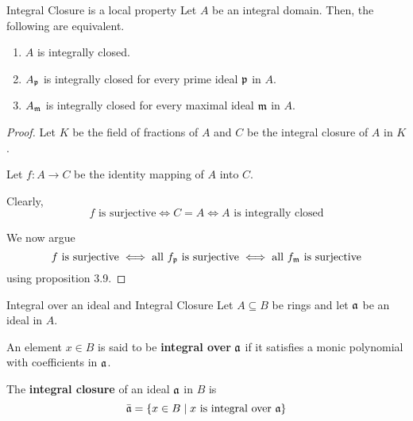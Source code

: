 \begin{proposition}{Integral Closure is a local property}{}
\label{prop:5.13}
	Let \(A\) be an integral domain.
	Then, the following are equivalent.
	\begin{enumerate}
		\item \(A\) is integrally closed.
		\item \(A_{\mathfrak{p}}\) is integrally closed for every prime ideal
			\(\mathfrak{p}\) in \(A\).
		\item \(A_{\mathfrak{m}}\) is integrally closed for every maximal ideal
			\(\mathfrak{m}\) in \(A\).
	\end{enumerate}
\end{proposition}
\begin{proof}
	Let \(K\) be the field of fractions of \(A\) and \(C\) be the integral
	closure of \(A\) in \(K\).

	Let \(f \colon A \to C\) be the identity mapping of \(A\) into \(C\).

	Clearly,
	\[
		f \text{ is surjective} \iff C = A \iff A \text{ is integrally closed}
	\]

	We now argue
	\[
		f \text{ is surjective} \iff \text{all }f_{\mathfrak{p}} \text{ is surjective}
		\iff \text{all } f_{\mathfrak{m}} \text{ is surjective}
	\]
	using proposition 3.9.
\end{proof}

\begin{defn}{Integral over an ideal and Integral Closure}{}
	Let \(A \subseteq B\) be rings and let \(\mathfrak{a}\) be an ideal in \(A\).

	An element \(x \in B\) is said to be \textbf{integral over} \(\mathfrak{a}\)
	if it satisfies a monic polynomial with coefficients in \(\mathfrak{a}\).

	The \textbf{integral closure} of an ideal \(\mathfrak{a}\) in \(B\) is
	\[
		\bar{\mathfrak{a}} = \left\{ x \in B \mid x \text{ is integral over } \mathfrak{a} \right\}
	\]
\end{defn}


